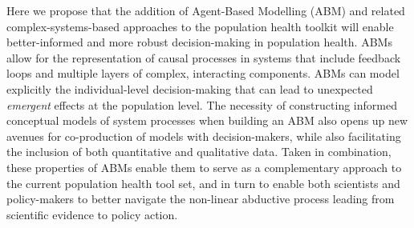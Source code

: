 \documentclass[review]{elsarticle}
\begin{document}
Here we propose that the addition of Agent-Based Modelling (ABM) and related complex-systems-based approaches to the population health toolkit will enable better-informed and more robust decision-making in population health.  ABMs allow for the representation of causal processes in systems that include feedback loops and multiple layers of complex, interacting components.  ABMs can model explicitly the individual-level decision-making that can lead to unexpected \emph{emergent} effects at the population level.  The necessity of constructing informed conceptual models of system processes when building an ABM also opens up new avenues for co-production of models with decision-makers, while also facilitating the inclusion of both quantitative and qualitative data.  Taken in combination, these properties of ABMs enable them to serve as a complementary approach to the current population health tool set, and in turn to enable both scientists and policy-makers to better navigate the non-linear abductive process leading from scientific evidence to policy action. 



\end{document}

